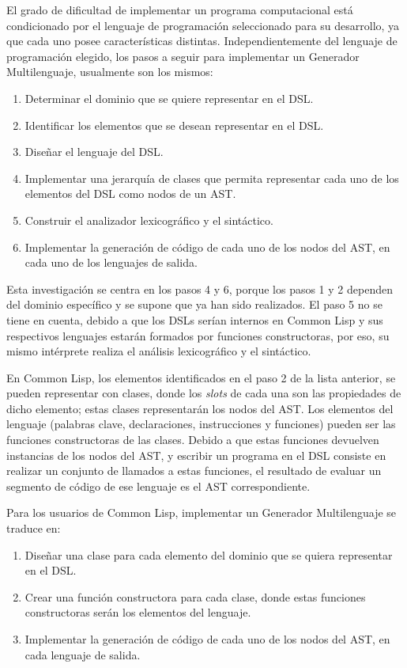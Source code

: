 El grado de dificultad de implementar un programa computacional está condicionado por el lenguaje de programación seleccionado para su desarrollo, ya que cada uno posee características distintas. Independientemente del lenguaje de programación elegido, los pasos a seguir para implementar un Generador Multilenguaje, usualmente son los mismos: 
\begin{enumerate}
	\item Determinar el dominio que se quiere representar en el DSL.
	\item Identificar los elementos que se desean representar en el DSL.
	\item \label{item:diseñar-dsl} Dise\~nar el lenguaje del DSL.
	\item \label{item:jerarquia-de-clases}Implementar una jerarqu\'ia de clases que permita representar cada uno de los elementos del DSL como nodos de un AST.
	\item \label{item:paso-parser-lexer} Construir el analizador lexicogr\'afico y el sint\'actico.
	\item 	\label{item:generacion-de-codigo}Implementar la generaci\'on de c\'odigo de cada uno de los nodos del AST, en cada uno de los lenguajes de salida.
\end{enumerate}

Esta investigación se centra en los pasos 4 y 6, porque los pasos 1 y 2 dependen del dominio específico y se supone que ya han sido realizados. El paso 5 no se tiene en cuenta, debido a que los DSLs serían internos en Common Lisp y sus respectivos lenguajes estarán formados por funciones constructoras, por eso, su mismo intérprete realiza el análisis lexicográfico y el sintáctico. 

En Common Lisp, los elementos identificados en el paso 2 de la lista anterior, se pueden representar con clases, donde los \textit{slots} de cada una son las propiedades de dicho elemento; estas clases representarán los nodos del AST. Los elementos del lenguaje (palabras clave, declaraciones, instrucciones y funciones) pueden ser las funciones constructoras de las clases.  Debido a que estas funciones devuelven instancias de los nodos del AST, y escribir un programa en el DSL consiste en realizar un conjunto de llamados a estas funciones, el resultado de evaluar un segmento de código de ese lenguaje es el AST correspondiente.

Para los usuarios de Common Lisp, implementar un Generador Multilenguaje se traduce en:
\begin{enumerate}
	\item Diseñar una clase para cada elemento del dominio que se quiera representar en el DSL.
	\item Crear una función constructora para cada clase, donde estas funciones constructoras serán los elementos del lenguaje.
	\item Implementar la generación de código de cada uno de los nodos del AST, en cada lenguaje de salida.
\end{enumerate}	

